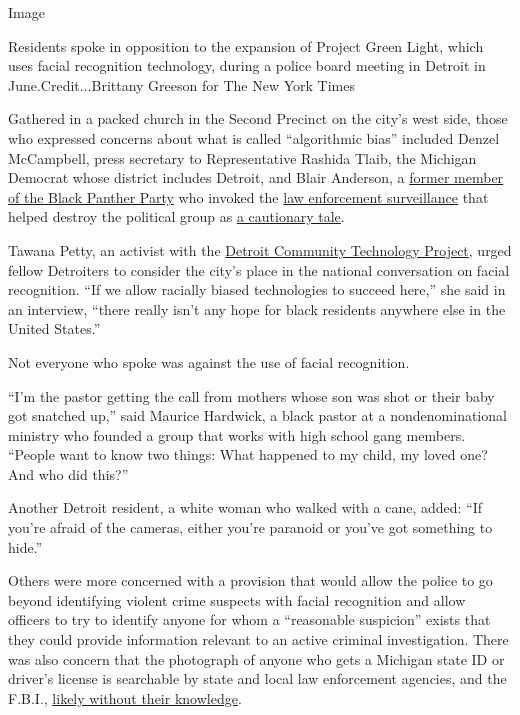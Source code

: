 Image

Residents spoke in opposition to the expansion of Project Green Light,
which uses facial recognition technology, during a police board meeting
in Detroit in June.Credit...Brittany Greeson for The New York Times

Gathered in a packed church in the Second Precinct on the city's west
side, those who expressed concerns about what is called ``algorithmic
bias'' included Denzel McCampbell, press secretary to Representative
Rashida Tlaib, the Michigan Democrat whose district includes Detroit,
and Blair Anderson, a
\href{https://www.nytimes3xbfgragh.onion/1970/05/09/archives/7-panthers-freed-in-chicago-clash-states-attorney-cites-lack-of.html}{former
member of the Black Panther Party} who invoked the
\href{https://www.intelligence.senate.gov/sites/default/files/94755_II.pdf}{law
enforcement surveillance} that helped destroy the political group as
\href{https://openjurist.org/600/f2d/600/hampton-v-hanrahan}{a
cautionary tale}.

Tawana Petty, an activist with the
\href{https://detroitcommunitytech.org/?q=content/critical-summary-detroit\%E2\%80\%99s-project-green-light-and-its-greater-context}{Detroit
Community Technology Project}, urged fellow Detroiters to consider the
city's place in the national conversation on facial recognition. ``If we
allow racially biased technologies to succeed here,'' she said in an
interview, ``there really isn't any hope for black residents anywhere
else in the United States.''

Not everyone who spoke was against the use of facial recognition.

``I'm the pastor getting the call from mothers whose son was shot or
their baby got snatched up,'' said Maurice Hardwick, a black pastor at a
nondenominational ministry who founded a group that works with high
school gang members. ``People want to know two things: What happened to
my child, my loved one? And who did this?''

Another Detroit resident, a white woman who walked with a cane, added:
``If you're afraid of the cameras, either you're paranoid or you've got
something to hide.''

Others were more concerned with a provision that would allow the police
to go beyond identifying violent crime suspects with facial recognition
and allow officers to try to identify anyone for whom a ``reasonable
suspicion'' exists that they could provide information relevant to an
active criminal investigation. There was also concern that the
photograph of anyone who gets a Michigan state ID or driver's license is
searchable by state and local law enforcement agencies, and the F.B.I.,
\href{https://www.freep.com/story/news/local/michigan/2019/03/11/michigan-state-police-facial-recognition-database/3102139002/}{likely
without their knowledge}.


